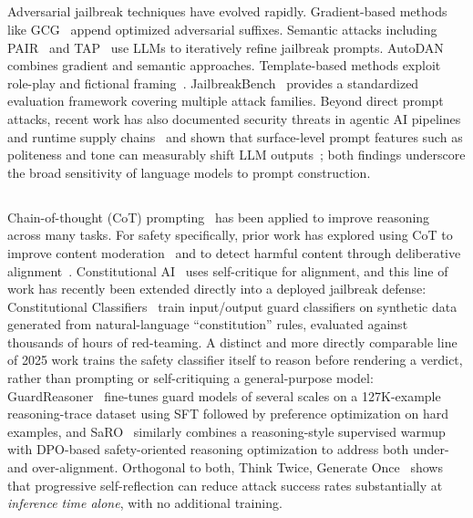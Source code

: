 \documentclass[superintelligence,article,accept,moreauthors]{Definitions/mdpi}
\begin{document}
\subsection{}
Adversarial jailbreak techniques have evolved rapidly. Gradient-based methods like GCG~\citep{zou2023universal} append optimized adversarial suffixes. Semantic attacks including PAIR~\citep{chao2023jailbreaking} and TAP~\citep{mehrotra2024tree} use LLMs to iteratively refine jailbreak prompts. AutoDAN~\citep{liu2024autodan} combines gradient and semantic approaches. Template-based methods exploit role-play and fictional framing~\citep{wei2024jailbroken, shen2024anything}. JailbreakBench~\citep{chao2024jailbreakbench} provides a standardized evaluation framework covering multiple attack families. Beyond direct prompt attacks, recent work has also documented security threats in agentic AI pipelines and runtime supply chains~\citep{jiang2026agentic} and shown that surface-level prompt features such as politeness and tone can measurably shift LLM outputs~\citep{cai2025tone}; both findings underscore the broad sensitivity of language models to prompt construction.

\subsection{}
\label{sec:related-reasoning}
Chain-of-thought (CoT) prompting~\citep{wei2022chain} has been applied to improve reasoning across many tasks. For safety specifically, prior work has explored using CoT to improve content moderation~\citep{wang2024chain} and to detect harmful content through deliberative alignment~\citep{bai2024deliberative}. Constitutional AI~\citep{bai2022constitutional} uses self-critique for alignment, and this line of work has recently been extended directly into a deployed jailbreak defense: Constitutional Classifiers~\citep{sharma2025constitutional} train input/output guard classifiers on synthetic data generated from natural-language ``constitution'' rules, evaluated against thousands of hours of red-teaming. A distinct and more directly comparable line of 2025 work trains the safety classifier itself to reason before rendering a verdict, rather than prompting or self-critiquing a general-purpose model: \mbox{GuardReasoner~\citep{liu2025guardreasoner}} fine-tunes guard models of several scales on a 127K-example reasoning-trace dataset using SFT followed by preference optimization on hard examples, and SaRO~\citep{mou2025saro} similarly combines a reasoning-style supervised warmup with DPO-based safety-oriented reasoning optimization to address both under- and over-alignment. Orthogonal to both, Think Twice, Generate Once~\citep{phan2025thinktwice} shows that progressive self-reflection can reduce attack success rates substantially at \emph{inference time alone}, with no additional training.
\end{document}
